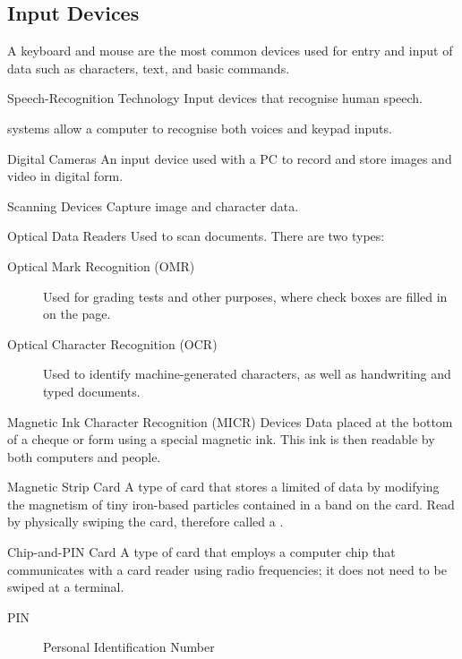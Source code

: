 \documentclass[\main/notes.tex]{subfiles}
\begin{document}
			\subsection{Input Devices}
				A keyboard and mouse are the most common devices used for entry and input of data such as characters, text, and basic commands.
				\begin{definition}{Speech-Recognition Technology}
					Input devices that recognise human speech.

					 systems allow a computer to recognise both voices and keypad inputs.
				\end{definition}
				\begin{definition}{Digital Cameras}
					An input device used with a PC to record and store images and video in digital form.
				\end{definition}
				\begin{definition}{Scanning Devices}
					Capture image and character data.
				\end{definition}
				\begin{definition}{Optical Data Readers}
					Used to scan documents. There are two types:
					\begin{description}
						\item[Optical Mark Recognition (OMR)] Used for grading tests and other purposes, where check boxes are filled in on the page.
						\item[Optical Character Recognition (OCR)] Used to identify machine-generated characters, as well as handwriting and typed documents.  
					\end{description}
				\end{definition}
				\begin{definition}{Magnetic Ink Character Recognition (MICR) Devices}
					Data placed at the bottom of a cheque or form using a special magnetic ink. This ink is then readable by both computers and people.
				\end{definition}
				\begin{definition}{Magnetic Strip Card}
					A type of card that stores a limited of data by modifying the magnetism of tiny iron-based particles contained in a band on the card. Read by physically swiping the card, therefore called a .
				\end{definition}
				\begin{definition}{Chip-and-PIN Card}
					A type of card that employs a computer chip that communicates with a card reader using radio frequencies; it does not need to be swiped at a terminal.

					\begin{description}
						\item[PIN] Personal Identification Number 
					\end{description}
				\end{definition}
\end{document}
